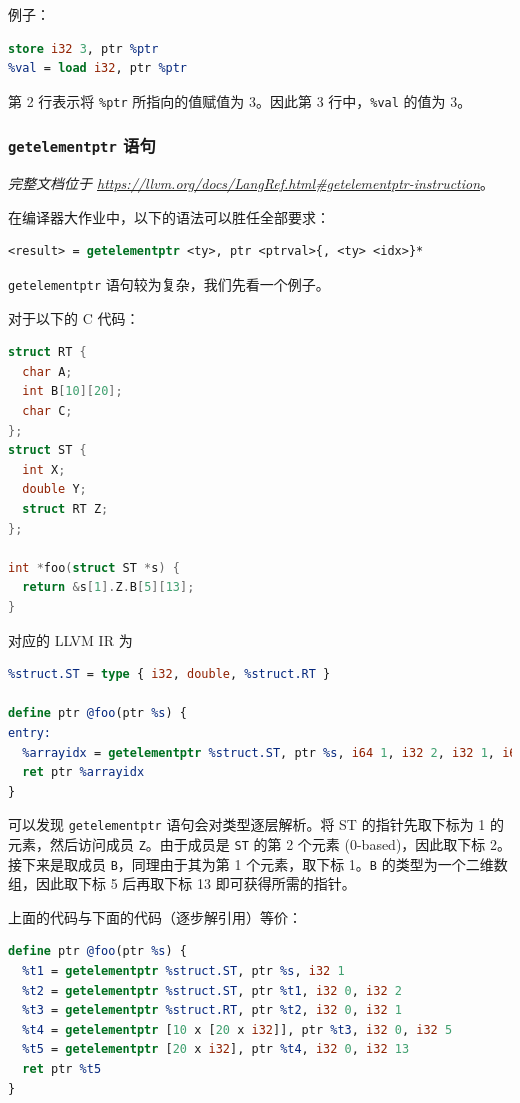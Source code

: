 例子：
\begin{lstlisting}[language=llvm]
%ptr = alloca i32
store i32 3, ptr %ptr
%val = load i32, ptr %ptr
\end{lstlisting}

第 2 行表示将 \texttt{\%ptr} 所指向的值赋值为 3。因此第 3 行中，\texttt{\%val}
的值为 3。

\subsubsection{\texttt{getelementptr} 语句}\label{LLVM-gep-statements}

\textit{完整文档位于 \url{https://llvm.org/docs/LangRef.html\#getelementptr-instruction}}。

在编译器大作业中，以下的语法可以胜任全部要求：
\begin{lstlisting}[language=llvm]
<result> = getelementptr <ty>, ptr <ptrval>{, <ty> <idx>}*
\end{lstlisting}

\texttt{getelementptr} 语句较为复杂，我们先看一个例子。

对于以下的 C 代码：
\begin{lstlisting}[language=C]
struct RT {
  char A;
  int B[10][20];
  char C;
};
struct ST {
  int X;
  double Y;
  struct RT Z;
};

int *foo(struct ST *s) {
  return &s[1].Z.B[5][13];
}
\end{lstlisting}
对应的 LLVM IR 为
\begin{lstlisting}[language=llvm]
%struct.RT = type { i8, [10 x [20 x i32]], i8 }
%struct.ST = type { i32, double, %struct.RT }

define ptr @foo(ptr %s) {
entry:
  %arrayidx = getelementptr %struct.ST, ptr %s, i64 1, i32 2, i32 1, i64 5, i64 13
  ret ptr %arrayidx
}
\end{lstlisting}

可以发现 \texttt{getelementptr} 语句会对类型逐层解析。将 ST 的指针先取下标为 1 的元素，然后访问成员
\texttt{Z}。由于成员是 \texttt{ST} 的第 2 个元素 (0-based)，因此取下标 2。接下来是取成员
\texttt{B}，同理由于其为第 1 个元素，取下标 1。\texttt{B} 的类型为一个二维数组，因此取下标 5 后再取下标 13
即可获得所需的指针。

上面的代码与下面的代码（逐步解引用）等价：
\begin{lstlisting}[language=llvm]define ptr @foo(ptr %s) {
  %t1 = getelementptr %struct.ST, ptr %s, i32 1
  %t2 = getelementptr %struct.ST, ptr %t1, i32 0, i32 2
  %t3 = getelementptr %struct.RT, ptr %t2, i32 0, i32 1
  %t4 = getelementptr [10 x [20 x i32]], ptr %t3, i32 0, i32 5
  %t5 = getelementptr [20 x i32], ptr %t4, i32 0, i32 13
  ret ptr %t5
}
\end{lstlisting}

